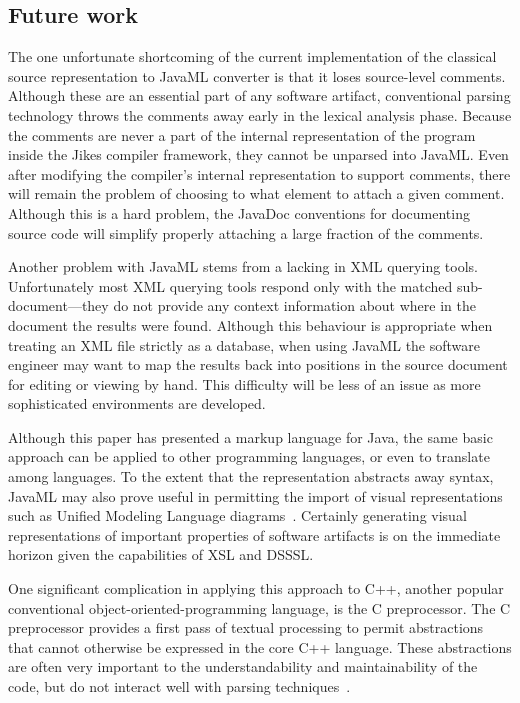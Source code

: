 \documentclass{article}
\begin{document}
\begin{multicols}{2}

\section{Future work}
\label{sec-future}

The one unfortunate shortcoming of the current implementation of the
classical source representation to JavaML converter is that it loses
source-level comments.  Although these are an essential part of any
software artifact, conventional parsing technology throws the comments
away early in the lexical analysis phase.  Because the comments are
never a part of the internal representation of the program inside the
Jikes compiler framework, they cannot be unparsed into JavaML.  Even
after modifying the compiler's internal representation to support
comments, there will remain the problem of choosing to what element to
attach a given comment.  Although this is a hard problem, the JavaDoc
conventions for documenting source code will simplify properly attaching
a large fraction of the comments.

Another problem with JavaML stems from a lacking in XML querying tools.
Unfortunately most XML querying tools respond only with the matched
sub-document---they do not provide any context information about where
in the document the results were found.  Although this behaviour is
appropriate when treating an XML file strictly as a database, when using 
JavaML the software engineer may want to map the results back into
positions in the source document for editing or viewing by hand.  This
difficulty will be less of an issue as more sophisticated environments
are developed.

Although this paper has presented a markup language for Java, the same
basic approach can be applied to other programming languages, or even to
translate among languages.  To the extent that the representation
abstracts away syntax, JavaML may also prove useful in permitting the
import of visual representations such as Unified Modeling Language
diagrams~\cite{UMLNutshell,XMI}.  Certainly generating visual
representations of important properties of software artifacts is on the
immediate horizon given the capabilities of XSL and DSSSL.

One significant complication in applying this approach to C++, another
popular conventional object-oriented-programming language, is the C
preprocessor.  The C preprocessor provides a first pass of textual
processing to permit abstractions that cannot otherwise be expressed in
the core C++ language.  These abstractions are often very important to
the understandability and maintainability of the code, but do not
interact well with parsing techniques~\cite{ErnstBadrosNotkin00,Badros00-spe}.


\end{multicols}
\end{document}
